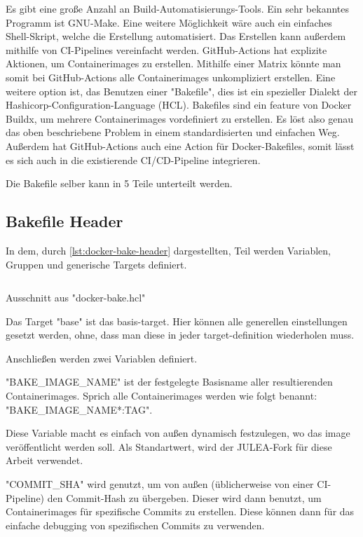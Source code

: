 Es gibt eine große Anzahl an Build-Automatisierungs-Tools. Ein sehr bekanntes Programm ist GNU-Make. Eine weitere Möglichkeit wäre auch ein einfaches Shell-Skript, welche die Erstellung automatisiert. Das Erstellen kann außerdem mithilfe von CI-Pipelines vereinfacht werden. GitHub-Actions hat explizite Aktionen, um Containerimages zu erstellen. Mithilfe einer Matrix könnte man somit bei GitHub-Actions alle Containerimages unkompliziert erstellen. Eine weitere option ist, das Benutzen einer "Bakefile", dies ist ein spezieller Dialekt der Hashicorp-Configuration-Language (HCL). Bakefiles sind ein feature von Docker Buildx, um mehrere Containerimages vordefiniert zu erstellen. Es löst also genau das oben beschriebene Problem in einem standardisierten und einfachen Weg. Außerdem hat GitHub-Actions auch eine Action für Docker-Bakefiles, somit lässt es sich auch in die existierende CI/CD-Pipeline integrieren. 

Die Bakefile selber kann in 5 Teile unterteilt werden.

\subsection{Bakefile Header}

In dem, durch \cref{lst:docker-bake-header} dargestellten, Teil werden Variablen, Gruppen und generische Targets definiert.

\begin{listing}[H]
    \inputminted[firstline=1,lastline=7]{./lexers/docker-bake-lexer.py}{./code-examples/docker-bake.hcl}
    \caption{Ausschnitt aus "docker-bake.hcl"}
    \label{lst:docker-bake-header}
\end{listing}

Das Target "base" ist das basis-target. Hier können alle generellen einstellungen gesetzt werden, ohne, dass man diese in jeder target-definition wiederholen muss. 

Anschließen werden zwei Variablen definiert. 

"BAKE\_IMAGE\_NAME" ist der festgelegte Basisname aller resultierenden Containerimages. Sprich alle Containerimages werden wie folgt benannt: "BAKE\_IMAGE\_NAME*:TAG".

Diese Variable macht es einfach von außen dynamisch festzulegen, wo das image veröffentlicht werden soll. Als Standartwert, wird der JULEA-Fork für diese Arbeit verwendet.

"COMMIT\_SHA" wird genutzt, um von außen (üblicherweise von einer CI-Pipeline) den Commit-Hash zu übergeben. Dieser wird dann benutzt, um Containerimages für spezifische Commits zu erstellen. Diese können dann für das einfache debugging von spezifischen Commits zu verwenden.

